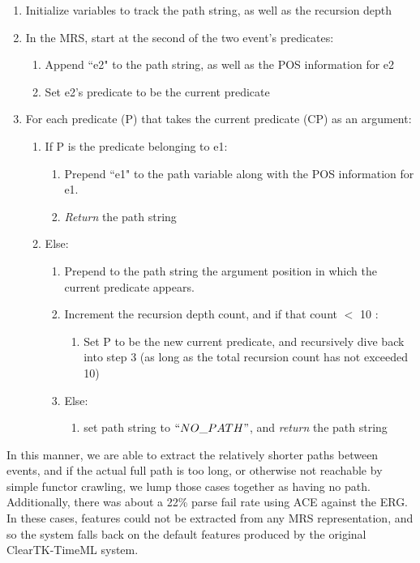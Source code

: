 \documentclass[11pt]{article}
\begin{document}
\begin{enumerate}
  \item Initialize variables to track the path string, as well as the recursion depth
  \item In the MRS, start at the second of the two event's predicates:
  \begin{enumerate}
  \item Append ``e2" to the path string, as well as the POS information for e2
  \item Set e2's predicate to be the current predicate
  \end{enumerate}
  \item For each predicate (P) that takes the current predicate (CP) as an argument:
  \begin{enumerate}
  \item If P is the predicate belonging to e1:
  \begin{enumerate} 
  \item Prepend ``e1" to the path variable along with the POS information for e1.
  \item \textit{Return} the path string
  \end{enumerate}
  \item Else:
  \begin{enumerate}
  \item Prepend to the path string the argument position in which the current predicate appears.
  \item Increment the recursion depth count, and if that count $<$ 10 :
  \begin{enumerate}
  \item Set P to be the new current predicate, and recursively dive back into step 3 (as long as the total recursion count has not exceeded 10)
  \end{enumerate}
  \item Else:
  \begin {enumerate}
  \item set path string to $``NO\_PATH"$, and \textit{return} the path string
  \end{enumerate}
   \end{enumerate}
  \end{enumerate}
\end{enumerate}

In this manner, we are able to extract the relatively shorter paths between events, and if the actual full path is too long, or otherwise not reachable by simple functor crawling, we lump those cases together as having no path.\\
\indent Additionally, there was about a 22\% parse fail rate using ACE against the ERG. In these cases, features could not be extracted from any MRS representation, and so the system falls back on the default features produced by the original ClearTK-TimeML system.
\end{document}
